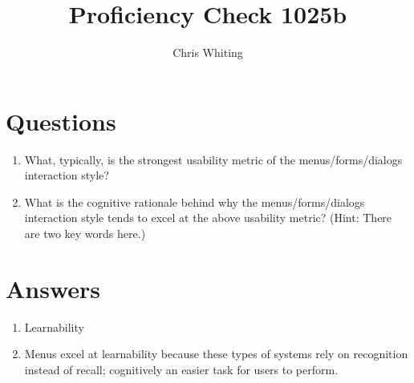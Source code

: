 \documentclass[11pt]{article}
\title{Proficiency Check 1025b}
\author{Chris Whiting}
\begin{document}
\maketitle

 
\section*{Questions}

\begin{enumerate}
\item What, typically, is the strongest usability metric of the menus/forms/dialogs interaction style?
\item What is the cognitive rationale behind why the menus/forms/dialogs interaction style tends to excel at the above usability metric? (Hint: There are two key words here.)
\end{enumerate}

\section*{Answers}

\begin{enumerate}
\item
 Learnability

\item
Menus excel at learnability because these types of systems rely on recognition instead of recall; cognitively an easier task for users to perform.

\end{enumerate}

%
%
\end{document}
